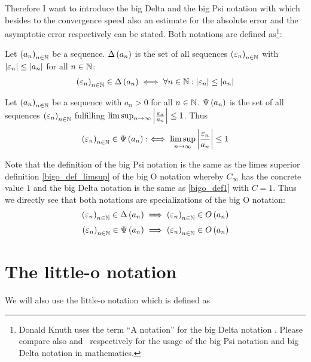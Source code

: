 Therefore I want to introduce the big Delta and the big Psi notation with which besides to the convergence speed also an estimate for the absolute error and the asymptotic error respectively can be stated. Both notations are defined as\footnote{Donald Knuth uses the term ``A notation'' for the big Delta notation \cite{anotation}. Please compare also \cite{tampis_bigpsi} and~\cite{tampis_bigabs} respectively for the usage of the big Psi notation and big Delta notation in mathematics.}:

\begin{definition}
  Let $\left({a_n}\right)_{{n}\in\mathbb N}$ be a sequence. $\Delta\left( {a_n} \right)$ is the set of all sequences $\left({\varepsilon_n}\right)_{{n}\in\mathbb N}$ with $\left|{\varepsilon_n}\right| \le \left|{a_n}\right|$ for all $n\in\mathbb N$:
  \begin{align}
    \left({\varepsilon_n}\right)_{{n}\in\mathbb N} \in \Delta\left( {a_n} \right) \iff \forall n\in\mathbb N: \left|{\varepsilon_n}\right| \le \left|{a_n}\right|
  \end{align}
\end{definition}

\begin{definition}
  Let $\left({a_n}\right)_{{n}\in\mathbb N}$ be a sequence with $a_n > 0$ for all $n\in\mathbb N$. $\Psi\left( {a_n} \right)$ is the set of all sequences $\left({\varepsilon_n}\right)_{{n}\in\mathbb N}$ fulfilling $\limsup_{n\to\infty} \left|{\frac{\varepsilon_n}{a_n}}\right| \le 1$. Thus
  \begin{align}
    \left({\varepsilon_n}\right)_{{n}\in\mathbb N} \in \Psi\left( {a_n} \right) :\iff \limsup_{n\to\infty} \left|{\frac{\varepsilon_n}{a_n}}\right| \le 1
  \end{align}
\end{definition}

Note that the definition of the big Psi notation is the same as the limes superior definition \eqref{bigo_def_limsup} of the big O notation whereby $C_\infty$ has the concrete value $1$ and the big Delta notation is the same as \eqref{bigo_def1} with $C=1$. Thus we directly see that both notations are specializations of the big O notation:
\begin{align}
  \seq{\epsilon_n} \in \bigabs{a_n} & \implies \seq{\epsilon_n} \in \bigo{a_n} \nl
  \seq{\epsilon_n} \in \bigpsi{a_n} & \implies \seq{\epsilon_n} \in \bigo{a_n}
\end{align}

\section{The little-o notation}

We will also use the little-o notation which is defined as~\cite[pp.~99,~103]{aigner}\cite[p.~385]{hachenberger}\cite{wiki:bigo}

